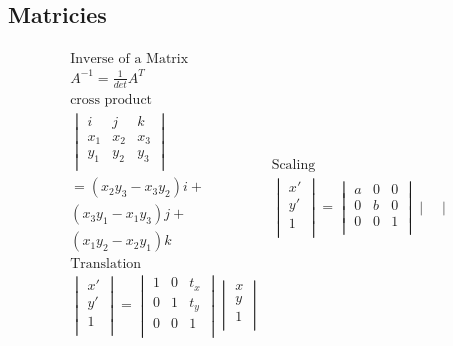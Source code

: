 \documentclass[8pt, english]{article}
\begin{document}
\begin{multicols}{3}
\subsection*{Matricies}
\begin{align*}
\begin{split}
\text{Inverse of a Matrix} \\ 
A^{-1}  =  \frac{1}{det} A^{T} \\
\text{cross product} \\
\begin{vmatrix}
i & j & k \\ 
x_1 & x_2 & x_3 \\ 
y_1 & y_2 & y_3 \\
\end{vmatrix} \\
 =  (x_2 y_3 - x_3 y_2)i  +\\
 (x_3 y_1 - x_1 y_3)j  + \\ 
  (x_1 y_2 - x_2 y_1)k \\
\text{Translation}\\ 
\begin{vmatrix}
 x' \\ y' \\ 1\\
\end{vmatrix} = \begin{vmatrix}
 1 & 0  & t_x\\ 0 & 1 & t_y \\ 0 & 0 & 1\\
\end{vmatrix} 
\begin{vmatrix}
x \\y \\ 1\\
\end{vmatrix} \\ 
\end{split}
\begin{split}
\text{Scaling} \\
\begin{vmatrix}
x' \\ y' \\ 1\\
\end{vmatrix} = \begin{vmatrix}
 a & 0  & 0\\ 0 & b & 0 \\ 0 & 0 & 1\\
\end{vmatrix} \begin{vmatrix}

\end{vmatrix}
\end{split}
\end{align*}
\end{multicols}
\end{document}
